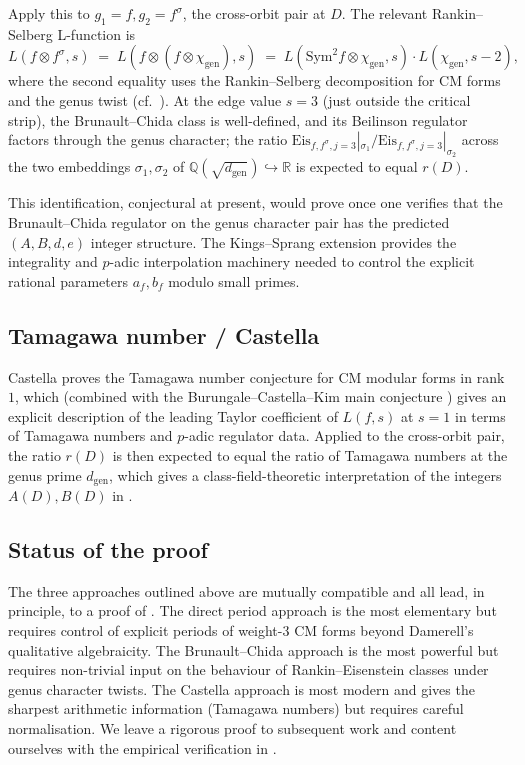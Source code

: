 \documentclass[11pt]{amsart}
\theoremstyle{definition}
\theoremstyle{remark}
\newcommand{\Q}{\mathbb{Q}}
\newcommand{\R}{\mathbb{R}}
\begin{document}
Apply this to \(g_{1} = f, g_{2} = f^{\sigma}\), the cross-orbit pair
at \(D\). The relevant Rankin--Selberg L-function is
\[
   L(f \otimes f^{\sigma}, s)
   \;=\;
   L(f \otimes (f \otimes \chi_{\mathrm{gen}}), s)
   \;=\;
   L(\mathrm{Sym}^{2} f \otimes \chi_{\mathrm{gen}}, s) \cdot
     L(\chi_{\mathrm{gen}}, s - 2),
\]
where the second equality uses the Rankin--Selberg decomposition for
CM forms and the genus twist (cf.\ \cite[\S~4]{Shimura1976}). At the
edge value \(s = 3\) (just outside the critical strip), the
Brunault--Chida class is well-defined, and its Beilinson regulator
factors through the genus character; the ratio
\(\mathrm{Eis}_{f, f^{\sigma}, j = 3}|_{\sigma_{1}}
  / \mathrm{Eis}_{f, f^{\sigma}, j = 3}|_{\sigma_{2}}\) across
the two embeddings \(\sigma_{1}, \sigma_{2}\) of
\(\Q(\sqrt{d_{\mathrm{gen}}}) \hookrightarrow \R\) is expected to
equal \(r(D)\).

This identification, conjectural at present, would prove
 once one verifies that the Brunault--Chida
regulator on the genus character pair has the predicted
\((A, B, d, e)\) integer structure. The Kings--Sprang
extension \cite{KingsSprang2025} provides the integrality and
\(p\)-adic interpolation machinery needed to control the explicit
rational parameters \(a_{f}, b_{f}\) modulo small primes.

\subsection{Tamagawa number / Castella}

Castella \cite{Castella2024} proves the Tamagawa number conjecture
for CM modular forms in rank \(1\), which (combined with the
Burungale--Castella--Kim main conjecture \cite{BurungaleCastellaKim2019})
gives an explicit description of the leading Taylor coefficient of
\(L(f, s)\) at \(s = 1\) in terms of Tamagawa numbers and
\(p\)-adic regulator data. Applied to the cross-orbit pair, the
ratio \(r(D)\) is then expected to equal the ratio of Tamagawa
numbers at the genus prime \(d_{\mathrm{gen}}\), which gives a
class-field-theoretic interpretation of the integers \(A(D), B(D)\)
in .

\subsection{Status of the proof}

The three approaches outlined above are mutually compatible and
all lead, in principle, to a proof of . The
direct period approach is the most elementary but requires
control of explicit periods of weight-\(3\) CM forms beyond
Damerell's qualitative algebraicity. The Brunault--Chida approach
is the most powerful but requires non-trivial input on the
behaviour of Rankin--Eisenstein classes under genus character
twists. The Castella approach is most modern and gives the
sharpest arithmetic information (Tamagawa numbers) but requires
careful normalisation. We leave a rigorous proof to subsequent
work and content ourselves with the empirical verification in
.
\end{document}

